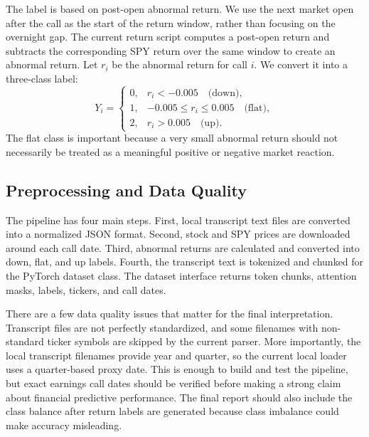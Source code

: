 \documentclass[11pt]{article}
\begin{document}
The label is based on post-open abnormal return. We use the next market open after the call as the start of the return window, rather than focusing on the overnight gap. The current return script computes a post-open return and subtracts the corresponding SPY return over the same window to create an abnormal return. Let $r_i$ be the abnormal return for call $i$. We convert it into a three-class label:
\[
Y_i =
\begin{cases}
0, & r_i < -0.005 \quad \text{(down)}, \\
1, & -0.005 \leq r_i \leq 0.005 \quad \text{(flat)}, \\
2, & r_i > 0.005 \quad \text{(up)}.
\end{cases}
\]
The flat class is important because a very small abnormal return should not necessarily be treated as a meaningful positive or negative market reaction.

\subsection{Preprocessing and Data Quality}

The pipeline has four main steps. First, local transcript text files are converted into a normalized JSON format. Second, stock and SPY prices are downloaded around each call date. Third, abnormal returns are calculated and converted into down, flat, and up labels. Fourth, the transcript text is tokenized and chunked for the PyTorch dataset class. The dataset interface returns token chunks, attention masks, labels, tickers, and call dates.

There are a few data quality issues that matter for the final interpretation. Transcript files are not perfectly standardized, and some filenames with non-standard ticker symbols are skipped by the current parser. More importantly, the local transcript filenames provide year and quarter, so the current local loader uses a quarter-based proxy date. This is enough to build and test the pipeline, but exact earnings call dates should be verified before making a strong claim about financial predictive performance. The final report should also include the class balance after return labels are generated because class imbalance could make accuracy misleading.
\end{document}
